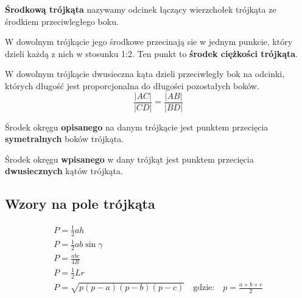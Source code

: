       \begin{definition}
        \textbf{Środkową trójkąta} nazywamy odcinek łączący wierzchołek trójkąta ze środkiem przeciwległego boku.
      \end{definition}
      \begin{theorem}
        W dowolnym trójkącie jego środkowe przecinają sie w jednym punkcie, który dzieli każdą z nich w stosunku 1:2. Ten punkt to \textbf{środek ciężkości trójkąta}.
      \end{theorem}
      \begin{theorem}
        W dowolnym trójkącie dwusieczna kąta dzieli przeciwległy bok na odcinki, których długość jest proporcjonalna do długości pozostałych boków.
        \begin{equation}
          \frac{|AC|}{|CD|} = \frac{|AB|}{|BD|}
        \end{equation}
      \end{theorem}
      \begin{theorem}
        Środek okręgu \textbf{opisanego} na danym trójkącie jest punktem przecięcia \textbf{symetralnych} boków trójkąta.
      \end{theorem}
      \begin{theorem}
        Środek okręgu \textbf{wpisanego} w dany trójkąt jest punktem przecięcia \textbf{dwusiecznych} kątów trójkąta.
      \end{theorem}
      \subsection{Wzory na pole trójkąta}
        \begin{gather}
          P = \frac 12ah\\
          P = \frac 12ab\sin\gamma\\
          P = \frac{abc}{4R}\\
          P = \frac 12Lr\\
          P = \sqrt{p(p-a)(p-b)(p-c)}\quad\text{gdzie:}\quad p = \frac{a+b+c}{2}
        \end{gather}
